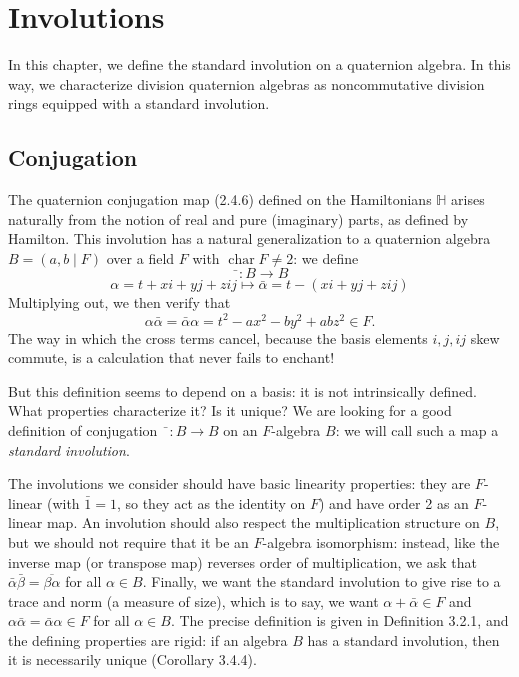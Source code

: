 \documentclass{article}
\theoremstyle{definition}
\begin{document}
\setcounter{section}{2}
\section{Involutions}

In this chapter, we define the standard involution on a quaternion algebra. In this way, we characterize division quaternion algebras as noncommutative division rings equipped with a standard involution.

\subsection{Conjugation}

The quaternion conjugation map (2.4.6) defined on the Hamiltonians $\mathbb{H}$ arises naturally from the notion of real and pure (imaginary) parts, as defined by Hamilton. This involution has a natural generalization to a quaternion algebra $B = (a, b \mid F)$ over a field $F$ with $\operatorname{char} F \neq 2$: we define
$$\bar{\phantom{a}}: B \rightarrow B$$
$$\alpha = t + xi + yj + zij \mapsto \bar{\alpha} = t - (xi + yj + zij)$$
Multiplying out, we then verify that
$$\alpha\bar{\alpha} = \bar{\alpha}\alpha = t^2 - ax^2 - by^2 + abz^2 \in F.$$
The way in which the cross terms cancel, because the basis elements $i, j, ij$ skew commute, is a calculation that never fails to enchant!

But this definition seems to depend on a basis: it is not intrinsically defined. What properties characterize it? Is it unique? We are looking for a good definition of conjugation $\bar{\phantom{a}}: B \rightarrow B$ on an $F$-algebra $B$: we will call such a map a \emph{standard involution}.

The involutions we consider should have basic linearity properties: they are $F$-linear (with $\bar{1} = 1$, so they act as the identity on $F$) and have order 2 as an $F$-linear map. An involution should also respect the multiplication structure on $B$, but we should not require that it be an $F$-algebra isomorphism: instead, like the inverse map (or transpose map) reverses order of multiplication, we ask that $\bar{\alpha}\bar{\beta} = \overline{\beta\alpha}$ for all $\alpha \in B$. Finally, we want the standard involution to give rise to a trace and norm (a measure of size), which is to say, we want $\alpha + \bar{\alpha} \in F$ and $\alpha\bar{\alpha} = \bar{\alpha}\alpha \in F$ for all $\alpha \in B$. The precise definition is given in Definition 3.2.1, and the defining properties are rigid: if an algebra $B$ has a standard involution, then it is necessarily unique (Corollary 3.4.4).
\end{document}

